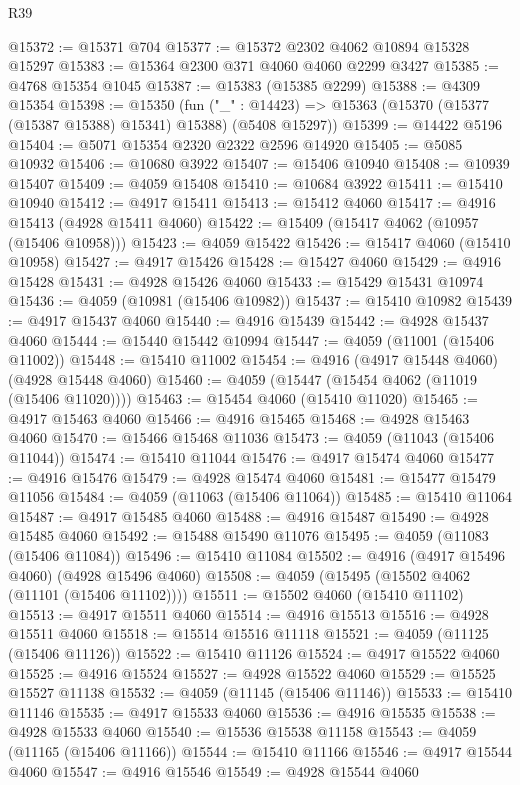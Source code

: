\begin{lexlean}{R39}
\begin{coremodule}
@15372 := @15371 @704
@15377 := @15372 @2302 @4062 @10894 @15328 @15297
@15383 := @15364 @2300 @371 @4060 @4060 @2299 @3427
@15385 := @4768 @15354 @1045
@15387 := @15383 (@15385 @2299)
@15388 := @4309 @15354
@15398 := @15350
    (fun ("_" : @14423) => @15363 (@15370 (@15377 (@15387 @15388) @15341) @15388) (@5408 @15297))
@15399 := @14422 @5196
@15404 := @5071 @15354 @2320 @2322 @2596 @14920
@15405 := @5085 @10932
@15406 := @10680 @3922
@15407 := @15406 @10940
@15408 := @10939 @15407
@15409 := @4059 @15408
@15410 := @10684 @3922
@15411 := @15410 @10940
@15412 := @4917 @15411
@15413 := @15412 @4060
@15417 := @4916 @15413 (@4928 @15411 @4060)
@15422 := @15409 (@15417 @4062 (@10957 (@15406 @10958)))
@15423 := @4059 @15422
@15426 := @15417 @4060 (@15410 @10958)
@15427 := @4917 @15426
@15428 := @15427 @4060
@15429 := @4916 @15428
@15431 := @4928 @15426 @4060
@15433 := @15429 @15431 @10974
@15436 := @4059 (@10981 (@15406 @10982))
@15437 := @15410 @10982
@15439 := @4917 @15437 @4060
@15440 := @4916 @15439
@15442 := @4928 @15437 @4060
@15444 := @15440 @15442 @10994
@15447 := @4059 (@11001 (@15406 @11002))
@15448 := @15410 @11002
@15454 := @4916 (@4917 @15448 @4060) (@4928 @15448 @4060)
@15460 := @4059 (@15447 (@15454 @4062 (@11019 (@15406 @11020))))
@15463 := @15454 @4060 (@15410 @11020)
@15465 := @4917 @15463 @4060
@15466 := @4916 @15465
@15468 := @4928 @15463 @4060
@15470 := @15466 @15468 @11036
@15473 := @4059 (@11043 (@15406 @11044))
@15474 := @15410 @11044
@15476 := @4917 @15474 @4060
@15477 := @4916 @15476
@15479 := @4928 @15474 @4060
@15481 := @15477 @15479 @11056
@15484 := @4059 (@11063 (@15406 @11064))
@15485 := @15410 @11064
@15487 := @4917 @15485 @4060
@15488 := @4916 @15487
@15490 := @4928 @15485 @4060
@15492 := @15488 @15490 @11076
@15495 := @4059 (@11083 (@15406 @11084))
@15496 := @15410 @11084
@15502 := @4916 (@4917 @15496 @4060) (@4928 @15496 @4060)
@15508 := @4059 (@15495 (@15502 @4062 (@11101 (@15406 @11102))))
@15511 := @15502 @4060 (@15410 @11102)
@15513 := @4917 @15511 @4060
@15514 := @4916 @15513
@15516 := @4928 @15511 @4060
@15518 := @15514 @15516 @11118
@15521 := @4059 (@11125 (@15406 @11126))
@15522 := @15410 @11126
@15524 := @4917 @15522 @4060
@15525 := @4916 @15524
@15527 := @4928 @15522 @4060
@15529 := @15525 @15527 @11138
@15532 := @4059 (@11145 (@15406 @11146))
@15533 := @15410 @11146
@15535 := @4917 @15533 @4060
@15536 := @4916 @15535
@15538 := @4928 @15533 @4060
@15540 := @15536 @15538 @11158
@15543 := @4059 (@11165 (@15406 @11166))
@15544 := @15410 @11166
@15546 := @4917 @15544 @4060
@15547 := @4916 @15546
@15549 := @4928 @15544 @4060

\end{coremodule}
\end{lexlean}

